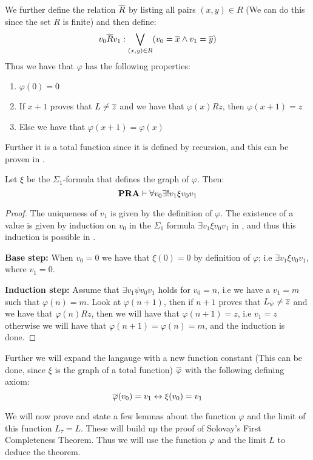 \documentclass[../main.tex]{subfiles}
\begin{document}
We further define the relation $\overline R$ by listing all pairs $(x,y)\in R$ (We
can do this since the set $R$ is finite) and
then define:
\[v_0 \overline Rv_1: \bigvee_{(x,y)\in R}(v_0=\overline x\wedge v_1=\overline y) \]
Thus we have that $\varphi$ has the following properties:
\begin{enumerate}
	\item $\varphi(0)=0$
	\item If $x+1$ proves that $L\not =\overline z$ and we have that $\varphi(x)Rz$,
		then $\varphi(x+1)=z$
	\item Else we have that $\varphi(x+1)=\varphi(x)$
\end{enumerate}
Further it is a total function
since it is defined by recursion, and this can be proven in \PRA.
\begin{prop}
	Let $\xi$ be the $\Sigma_1$-formula that defines the graph of
	$\varphi$. Then:
	\[\text{\textbf{PRA}}\vdash\forall v_0\exists !v_1\xi v_0v_1\]
\end{prop}
\begin{proof}
	The uniqueness of $v_1$ is given by the definition of $\varphi$. The
	existence of a value is given by induction on $v_0$ in the $\Sigma_1$ formula $\exists
	v_1\xi v_0v_1$ in \PRA, and thus this induction is possible in \PRA. 

	\textbf{Base step:} When $v_0=0$ we have that $\xi(0)=0$ by
	definition of $\varphi$; i.e $\exists v_1\xi v_0v_1$, where $v_1=0$.

	\textbf{Induction step:} Assume that $\exists v_1\psi v_0v_1$ holds for
	$v_0=n$, i.e we have a $v_1=m$ such that $\varphi(n)=m$. Look at
	$\varphi(n+1)$, then if $n+1$ proves that $L_\psi\not =\overline z$ and we
	have that $\varphi(n)Rz$, then we will have that $\varphi(n+1)=z$, i.e
	$v_1=z$ otherwise we will have that $\varphi(n+1)=\varphi(n)=m$, and
	the induction is done.
\end{proof}
Further we will expand the langauge with a new function constant (This can be
done, since $\xi$ is the graph of a total function) $\overline \varphi$ with the following
defining axiom:
$$\overline \varphi(v_0)=v_1\leftrightarrow\xi (v_0)=v_1$$

We will now prove and state a few lemmas about the function $\varphi$ and the
limit of this function $L_\tau=L$. These will build up the proof of Solovay's
First Completeness Theorem. Thus we will use the function $\varphi$ and the
limit $L$ to deduce the theorem.
\end{document}
